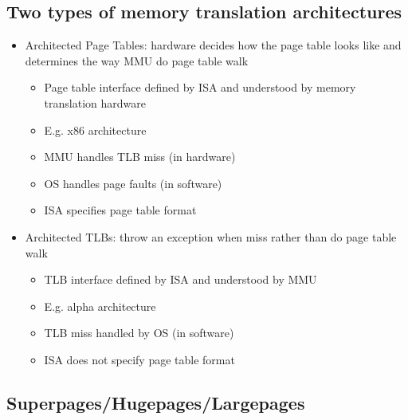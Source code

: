 \documentclass[12pt]{article}
\begin{document}
\subsection{Two types of memory translation architectures}
\begin{itemize}
    \item Architected Page Tables: hardware decides how the page table looks like and determines the way MMU do page table walk \begin{itemize}
        \item Page table interface defined by ISA and understood by memory translation hardware
        \item E.g. x86 architecture
        \item MMU handles TLB miss (in hardware)
        \item OS handles page faults (in software)
        \item ISA specifies page table format
    \end{itemize}
    \item Architected TLBs: throw an exception when miss rather than do page table walk \begin{itemize}
        \item TLB interface defined by ISA and understood by MMU
        \item E.g. alpha architecture
        \item TLB miss handled by OS (in software)
        \item ISA does not specify page table format
    \end{itemize}
\end{itemize}
\subsection{Superpages/Hugepages/Largepages}
\end{document}
